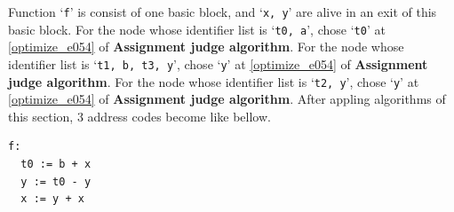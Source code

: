 \begin{Example}
\begin{figure}[htbp]
\end{figure}
Function `{\tt{f}}' is consist of one basic block, and 
`{\tt{x, y}}' are alive in an exit of this basic block.
For the node whose identifier list is `{\tt{t0, a}}',
chose `{\tt{t0}}' at \ref{optimize_e054} of {\bf Assignment judge algorithm}.
For the node whose identifier list is `{\tt{t1, b, t3, y}}',
chose `{\tt{y}}' at \ref{optimize_e054} of {\bf Assignment judge algorithm}.
For the node whose identifier list is `{\tt{t2, y}}',
chose `{\tt{y}}' at \ref{optimize_e054} of {\bf Assignment judge algorithm}.
After appling algorithms of this section,
3 address codes become like bellow.
\begin{verbatim}
f:
  t0 := b + x
  y := t0 - y
  x := y + x
\end{verbatim}
\end{Example}

